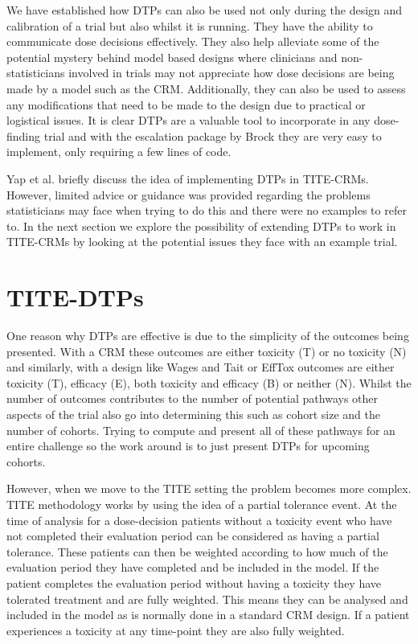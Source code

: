 We have established how DTPs can also be used not only during the design and calibration of a trial but also whilst it is running. They have the ability to communicate dose decisions effectively. They also help alleviate some of the potential mystery behind model based designs where clinicians and non-statisticians involved in trials may not appreciate how dose decisions are being made by a model such as the CRM. Additionally, they can also be used to assess any modifications that need to be made to the design due to practical or logistical issues. It is clear DTPs are a valuable tool to incorporate in any dose-finding trial and with the escalation package by Brock \cite{brockModularApproachDose2020} they are very easy to implement, only requiring a few lines of code. 

Yap et al. \cite{yapDoseTransitionPathways2017} briefly discuss the idea of implementing DTPs in TITE-CRMs. However, limited advice or guidance was provided regarding the problems statisticians may face when trying to do this and there were no examples to refer to. In the next section we explore the possibility of extending DTPs to work in TITE-CRMs by looking at the potential issues they face with an example trial.  


\section{TITE-DTPs}
\label{tite-dtp:TITE-DTPs}

One reason why DTPs are effective is due to the simplicity of the outcomes being presented. With a CRM these outcomes are either toxicity (T) or no toxicity (N) and similarly, with a design like Wages and Tait or EffTox outcomes are either toxicity (T), efficacy (E), both toxicity and efficacy (B) or neither (N). Whilst the number of outcomes contributes to the number of potential pathways other aspects of the trial also go into determining this such as cohort size and the number of cohorts. Trying to compute and present all of these pathways for an entire challenge so the work around is to just present DTPs for upcoming cohorts.  

However, when we move to the TITE setting the problem becomes more complex. TITE methodology works by using the idea of a partial tolerance event. At the time of analysis for a dose-decision patients without a toxicity event who have not completed their evaluation period can be considered as having a partial tolerance. These patients can then be weighted according to how much of the evaluation period they have completed and be included in the model. If the patient completes the evaluation period without having a toxicity they have tolerated treatment and are fully weighted. This means they can be analysed and included in the model as is normally done in a standard CRM design. If a patient experiences a toxicity at any time-point they are also fully weighted. 

